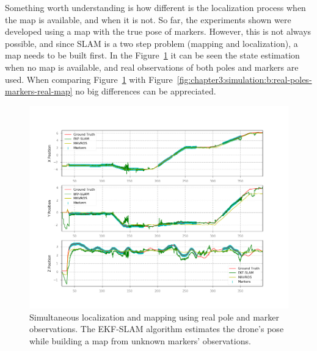 Something worth understanding is how different is the localization process when the map is available, and when it is not. So far, the experiments shown were developed using a map with the true pose of markers. However, this is not always possible, and since \ac{SLAM} is a two step problem (mapping and localization), a map needs to be built first. In the Figure~\ref{fig:chapter3:simulation:b:real-poles-markers-no-map} it can be seen the state estimation when no map is available, and real observations of both poles and markers are used. When comparing Figure~\ref{fig:chapter3:simulation:b:real-poles-markers-no-map} with Figure~\ref{fig:chapter3:simulation:b:real-poles-markers-real-map} no big differences can be appreciated.\\
\begin{figure}
    \centering
    \includegraphics[width=\textwidth]{Images/fig22-true-poles-markers-nomap.png}
    \caption[Simultaneous localization and mapping using real pole and marker observations.]{Simultaneous localization and mapping using real pole and marker observations. The EKF-SLAM algorithm estimates the drone's pose while building a map from unknown markers' observations.}
    \label{fig:chapter3:simulation:b:real-poles-markers-no-map}
\end{figure}


